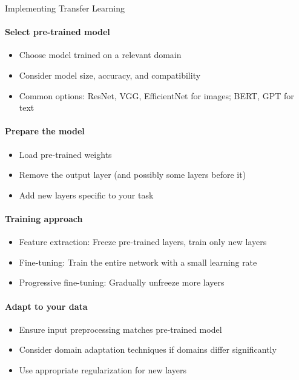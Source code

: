 \begin{KR}{Implementing Transfer Learning}\\
\paragraph{Select pre-trained model}
\begin{itemize}
    \item Choose model trained on a relevant domain
    \item Consider model size, accuracy, and compatibility
    \item Common options: ResNet, VGG, EfficientNet for images; BERT, GPT for text
\end{itemize}

\paragraph{Prepare the model}
\begin{itemize}
    \item Load pre-trained weights
    \item Remove the output layer (and possibly some layers before it)
    \item Add new layers specific to your task
\end{itemize}

\paragraph{Training approach}
\begin{itemize}
    \item Feature extraction: Freeze pre-trained layers, train only new layers
    \item Fine-tuning: Train the entire network with a small learning rate
    \item Progressive fine-tuning: Gradually unfreeze more layers
\end{itemize}

\paragraph{Adapt to your data}
\begin{itemize}
    \item Ensure input preprocessing matches pre-trained model
    \item Consider domain adaptation techniques if domains differ significantly
    \item Use appropriate regularization for new layers
\end{itemize}
\end{KR}

